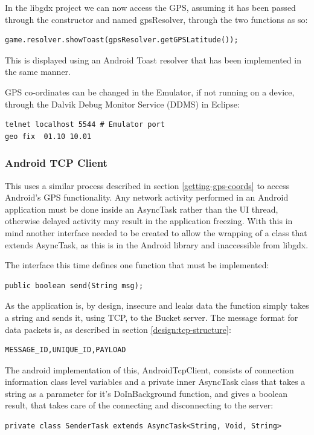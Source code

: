 In the libgdx project we can now access the GPS, assuming it has been passed through the constructor and named gpsResolver, through the two functions as so:
\begin{verbatim}
game.resolver.showToast(gpsResolver.getGPSLatitude());
\end{verbatim}
This is displayed using an Android Toast resolver that has been implemented in the same manner.

GPS co-ordinates can be changed in the Emulator, if not running on a device,  through the Dalvik Debug Monitor Service (DDMS) in Eclipse:
\begin{verbatim}
telnet localhost 5544 # Emulator port
geo fix  01.10 10.01
\end{verbatim}

\subsubsection{Android TCP Client}
This uses a similar process described in section \ref{getting-gps-coords} to access Android’s GPS functionality. Any network activity performed in an Android application must be done inside an AsyncTask rather than the UI thread, otherwise delayed activity may result in the application freezing. With this in mind another interface needed to be created to allow the wrapping of a class that extends AsyncTask, as this is in the Android library and inaccessible from libgdx.

The interface this time defines one function that must be implemented:
\begin{verbatim}
public boolean send(String msg);
\end{verbatim}

As the application is, by design, insecure and leaks data the function simply takes a string and sends it, using TCP, to the Bucket server. The message format for data packets is, as described in section \ref{design:tcp-structure}:
\begin{verbatim}
MESSAGE_ID,UNIQUE_ID,PAYLOAD
\end{verbatim}

The android implementation of this, AndroidTcpClient, consists of connection information class level variables and a private inner AsyncTask class that takes a string as a parameter for it’s DoInBackground function, and gives a boolean result, that takes care of the connecting and disconnecting to the server:

\begin{verbatim}
private class SenderTask extends AsyncTask<String, Void, String>
\end{verbatim}

